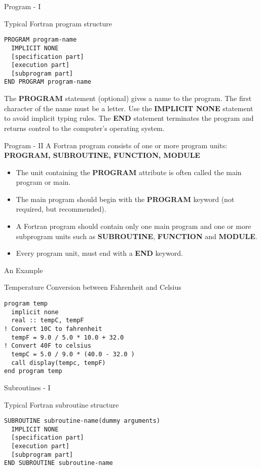 \begin{frame}[fragile]{Program - I}
\begin{block}{Typical Fortran program structure}
\begin{lstlisting}
PROGRAM program-name
  IMPLICIT NONE
  [specification part]
  [execution part]
  [subprogram part]
END PROGRAM program-name
\end{lstlisting}
\end{block}
The \textbf{PROGRAM} statement (optional) gives a name to the program. 
The first character of the name must be a letter. Use the \textbf{IMPLICIT NONE} statement to
avoid implicit typing rules. The \textbf{END} statement terminates the program and returns control to the 
computer's operating system.
\end{frame}

\begin{frame}[fragile]{Program - II}
A Fortran program consists of one or more program units:
\textbf{PROGRAM, SUBROUTINE, FUNCTION, MODULE}
\begin{itemize}
 \item The unit containing the \textbf{PROGRAM} attribute is often called the main
program or main.
 \item The main program should begin with the \textbf{PROGRAM} keyword (not required, but recommended).
 \item A Fortran program should contain only one main program and one or more subprogram
units such as \textbf{SUBROUTINE}, \textbf{FUNCTION} and \textbf{MODULE}.
 \item Every program unit, must end with a \textbf{END} keyword.
\end{itemize}
\end{frame}


\begin{frame}[fragile]{An Example}
\begin{block}{Temperature Conversion between Fahrenheit and Celsius}
\begin{lstlisting}
program temp
  implicit none
  real :: tempC, tempF
! Convert 10C to fahrenheit
  tempF = 9.0 / 5.0 * 10.0 + 32.0
! Convert 40F to celsius
  tempC = 5.0 / 9.0 * (40.0 - 32.0 )
  call display(tempc, tempF)
end program temp
\end{lstlisting}
\end{block}
\end{frame}


\begin{frame}[fragile]{Subroutines - I}
\begin{block}{Typical Fortran subroutine structure}
\begin{lstlisting}
SUBROUTINE subroutine-name(dummy arguments)
  IMPLICIT NONE
  [specification part]
  [execution part]
  [subprogram part]
END SUBROUTINE subroutine-name
\end{lstlisting}
\end{block}
\end{frame}

